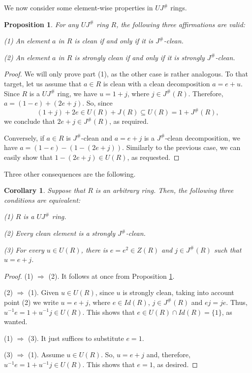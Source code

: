 \documentclass[12pt]{amsart}
\newtheorem{proposition}[theorem]{Proposition}
\newtheorem{corollary}[theorem]{Corollary}
\theoremstyle{definition}
\begin{document}
We now consider some element-wise properties in $UJ^{\#}$ rings.

\begin{proposition}\label{pro clean element}
For any $UJ^{\#}$ ring $R$, the following three affirmations are valid:
	
(1) An element $a$ in $R$ is clean if and only if it is $J^{\#}$-clean.
	
(2) An element $a$ in $R$ is strongly clean if and only if it is strongly $J^{\#}$-clean.
\end{proposition}

\begin{proof}
We will only prove part (1), as the other case is rather analogous. To that target, let us assume that $a \in R$ is clean with a clean decomposition $a = e + u$. Since $R$ is a $UJ^{\#}$ ring, we have $u = 1 + j$, where $j \in J^{\#}(R)$. Therefore, $a = (1 - e) + (2e + j)$. So, since $$(1 + j) + 2e \in U(R) + J(R) \subseteq U(R) = 1 + J^{\#}(R),$$ we conclude that $2e + j \in J^{\#}(R)$, as required.
	
Conversely, if $a \in R$ is $J^{\#}$-clean and $a = e + j$ is a $J^{\#}$-clean decomposition, we have $a = (1 - e) - (1 - (2e + j))$. Similarly to the previous case, we can easily show that $1 - (2e + j) \in U(R)$, as requested.
\end{proof}

Three other consequences are the following.

\begin{corollary}\label{impor cor equ}
Suppose that $R$ is an arbitrary ring. Then, the following three conditions are equivalent:
	
(1) $R$ is a $UJ^{\#}$ ring.
	
(2) Every clean element is a strongly $J^{\#}$-clean.
	
(3) For every $u \in U(R)$, there is $e = e^2 \in Z(R)$ and $j \in J^{\#}(R)$ such that $u = e + j$.
\end{corollary}

\begin{proof}
(1) $\Rightarrow$ (2). It follows at once from Proposition \ref{pro clean element}.
	
(2) $\Rightarrow$ (1). Given $u \in U(R)$, since $u$ is strongly clean, taking into account point (2) we write $u = e + j$, where $e \in Id(R)$, $j \in J^{\#}(R)$ and $ej = je$. Thus, $u^{-1}e = 1 + u^{-1}j \in U(R)$. This shows that $e \in U(R) \cap Id(R) = \{1\}$, as wanted.
	
(1) $\Rightarrow$ (3). It just suffices to substitute $e = 1$.
	
(3) $\Rightarrow$ (1). Assume $u \in U(R)$. So, $u = e + j$ and, therefore, $u^{-1}e = 1 + u^{-1}j \in U(R)$. This shows that $e = 1$, as desired.
\end{proof}
\end{document}
